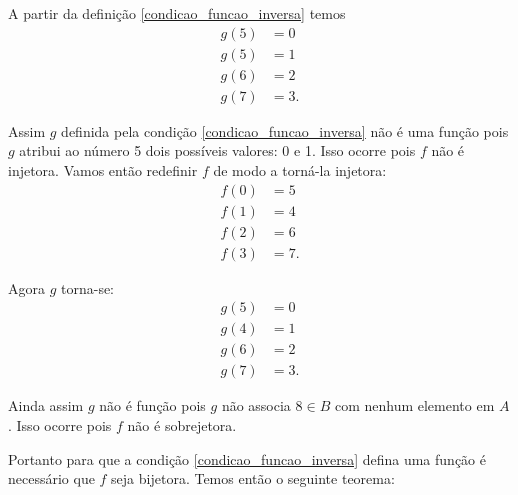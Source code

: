 A partir da definição \eqref{condicao_funcao_inversa} temos
\begin{align*}
    g(5) &= 0\\
    g(5) &= 1\\
    g(6) &= 2\\
    g(7) &= 3.
\end{align*}

Assim $g$ definida pela condição \eqref{condicao_funcao_inversa} não é uma função pois $g$ atribui ao número 5 dois possíveis valores: 0 e 1. Isso ocorre pois $f$ não é injetora. Vamos então redefinir $f$ de modo a torná-la injetora:
\begin{align*}
    f(0) &= 5\\
    f(1) &= 4\\
    f(2) &= 6\\
    f(3) &= 7.
\end{align*}

Agora $g$ torna-se:
\begin{align*}
    g(5) &= 0\\
    g(4) &= 1\\
    g(6) &= 2\\
    g(7) &= 3.
\end{align*}

Ainda assim $g$ não é função pois $g$ não associa $8 \in B$ com nenhum elemento em $A$. Isso ocorre pois $f$ não é sobrejetora.

Portanto para que a condição \eqref{condicao_funcao_inversa} defina uma função é necessário que $f$ seja bijetora. Temos então o seguinte teorema:

